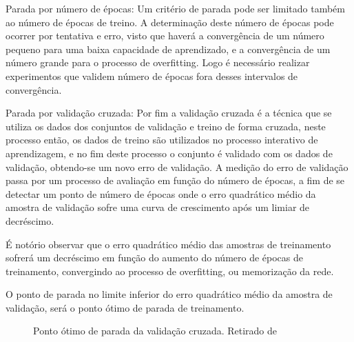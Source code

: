 \documentclass[	12pt, Times, openright, twoside, a4paper, english, brazil]{abntex2}
\begin{document}
            	Parada por número de épocas:
            	Um critério de parada pode ser limitado também ao número de épocas de treino. A determinação  deste número de épocas pode ocorrer por tentativa e erro, visto que haverá a convergência de um número pequeno para uma baixa capacidade de aprendizado, e a convergência de um número grande para o processo de overfitting. Logo é necessário realizar experimentos que validem número de épocas fora desses intervalos de convergência.
            	
            	Parada por validação cruzada:
            	Por fim a validação cruzada é a técnica que se utiliza os dados dos conjuntos de validação e treino de forma cruzada, neste processo então, os dados de treino são utilizados no processo interativo de aprendizagem, e no fim deste processo o conjunto é validado com os dados de validação, obtendo-se um novo erro de validação.
            	A medição do erro de validação passa por um processo de avaliação em função do número de épocas, a fim de se detectar um ponto de número de épocas onde o erro quadrático médio da amostra de validação sofre uma curva de crescimento após um limiar de decréscimo.
            	
            	É notório observar que o erro quadrático médio das amostras de treinamento sofrerá um decréscimo em função do aumento do número de épocas de treinamento, convergindo ao processo de overfitting, ou memorização da rede.
            	
            	O ponto de parada no limite inferior do erro quadrático médio da amostra de validação, será o ponto ótimo de parada de treinamento.
          	
          	\begin{figure}[!ht]
          		\caption{Ponto ótimo de parada da validação cruzada. Retirado de \cite{Flavia2014} \label{fig:validacaoCruzada}}
          	\end{figure}
        
\end{document}
